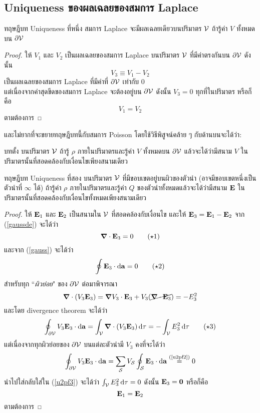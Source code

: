 \subsection{Uniqueness ของผลเฉลยของสมการ Laplace}
\begin{lawbox}{ทฤษฎีบท Uniqueness ที่หนึ่ง}
    สมการ Laplace จะมีผลเฉลยเดียวบนปริมาตร $\mathcal{V}$ ถ้ารู้ค่า $V$ ทั้งหมดบน $\partial\mathcal{V}$
\end{lawbox}
\begin{proof}
    ให้ $V_1$ และ $V_2$ เป็นผลเฉลยของสมการ Laplace บนปริมาตร $\mathcal{V}$ ที่มีค่าตรงกันบน $\partial\mathcal{V}$ ดังนั้น
    \[V_3\equiv V_1-V_2\]
    เป็นผลเฉลยของสมการ Laplace ที่มีค่าที่ $\partial\mathcal{V}$ เท่ากับ $0$\\
    แต่เนื่องจากค่าสุดขีดของสมการ Laplace จะต้องอยู่บน $\partial\mathcal{V}$ ดังนั้น $V_3=0$ ทุกที่ในปริมาตร หรือก็คือ
    \[V_1=V_2\]
    ตามต้องการ
\end{proof}
และไม่ยากที่จะขยายทฤษฎีบทนี้กับสมการ Poisson โดยใช้วิธีพิสูจน์คล้าย ๆ กับด้านบนจะได้ว่า:
\begin{corbox}{บทตั้ง}
    บนปริมาตร $\mathcal{V}$ ถ้ารู้ $\rho$ ภายในปริมาตรและรู้ค่า $V$ ทั้งหมดบน $\partial\mathcal{V}$ แล้วจะได้ว่ามีสนาม $V$ ในปริมาตรนั้นที่สอดคล้องกับเงื่อนไขเพียงสนามเดียว
\end{corbox}

\begin{lawbox}{ทฤษฎีบท Uniqueness ที่สอง}
    บนปริมาตร $\mathcal{V}$ ที่มีขอบเขตอยู่บนผิวของตัวนำ (อาจมีขอบเขตหนึ่งเป็นตัวนำที่ $\infty$ ได้) ถ้ารู้ค่า $\rho$ ภายในปริมาตรและรู้ค่า $Q$ ของตัวนำทั้งหมดแล้วจะได้ว่ามีสนาม $\mathbf{E}$ ในปริมาตรนั้นที่สอดคล้องกับเงื่อนไขทั้งหมดเพียงสนามเดียว
\end{lawbox}
\begin{proof}
    ให้ $\mathbf{E}_1$ และ $\mathbf{E}_2$ เป็นสนามใน $\mathcal{V}$ ที่สอดคล้องกับเงื่อนไข และให้ $\mathbf{E}_3=\mathbf{E}_1-\mathbf{E}_2$ จาก (\ref{gaussde}) จะได้ว่า
    \begin{equation}
        \boldsymbol{\nabla}\cdot\mathbf{E}_3=0\tag{$\star$1}
    \end{equation}
    และจาก (\ref{gauss}) จะได้ว่า
    \begin{equation}
        \oint\vb{E}_3\cdot\odif{\vb{a}}=0\tag{$\star$2}\label{u2pf2}
    \end{equation}
    สำหรับทุก ``\emph{ผิวย่อย}" ของ $\partial\mathcal{V}$ ต่อมาพิจารณา
    \[\boldsymbol{\nabla}\cdot(V_3\mathbf{E}_3)=\boldsymbol{\nabla} V_3\cdot\mathbf{E}_3+V_3(\cancel{\boldsymbol{\nabla}\cdot\mathbf{E}_3})=-E_3^2\]
    และโดย divergence theorem จะได้ว่า
    \begin{equation}
    \oint_{\del\vol}V_3\vb{E}_3\cdot\odif{\vb{a}}=\int_\vol\gd\cdot(V_3\vb{E}_3)\odif{\tau}=-\int_\vol E_3^2\odif{\tau}\tag{$\star$3}\label{u2pf3}
    \end{equation}
    แต่เนื่องจากทุกผิวย่อยของ $\partial\mathcal{V}$ บนแต่ละตัวนำมี $V_3$ คงที่จะได้ว่า
    \[\oint_{\del\vol}V_3\vb{E}_3\cdot\odif{\vb{a}}=\sum_{\txt{\sur}}V_\sur\oint_\sur\vb{E}_3\cdot\odif{\vb{a}}\overset{\text{(\ref{u2pf2})}}{=}0\]
    นำไปใส่กลับใส่ใน (\ref{u2pf3}) จะได้ว่า $\int_\vol E_3^2\odif{\tau}=0$ ดังนั้น $\mathbf{E}_3=\mathbf{0}$ หรือก็คือ
    \[\mathbf{E}_1=\mathbf{E}_2\]
    ตามต้องการ
\end{proof}

